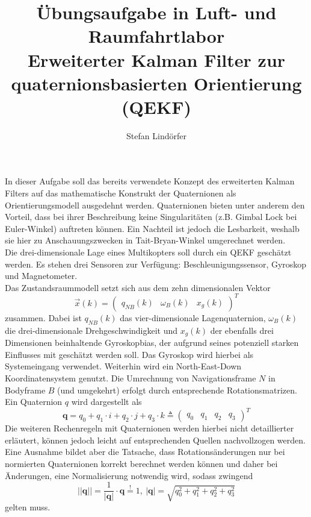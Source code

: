 \documentclass[12pt,a4paper]{article}
\begin{document}
	\title{Übungsaufgabe in Luft- und Raumfahrtlabor\\Erweiterter Kalman Filter zur quaternionsbasierten Orientierung (QEKF)}
	\author{Stefan Lindörfer}
	\maketitle{}
	
	In dieser Aufgabe soll das bereits verwendete Konzept des erweiterten Kalman Filters auf das mathematische Konstrukt der Quaternionen als Orientierungsmodell ausgedehnt werden. Quaternionen bieten unter anderem den Vorteil, dass bei ihrer Beschreibung keine Singularitäten (z.B. Gimbal Lock bei Euler-Winkel) auftreten können. Ein Nachteil ist jedoch die Lesbarkeit, weshalb sie hier zu Anschauungszwecken in Tait-Bryan-Winkel umgerechnet werden.\\
	
	Die drei-dimensionale Lage eines Multikopters soll durch ein QEKF geschätzt werden. Es stehen drei Sensoren zur Verfügung: Beschleunigungssensor, Gyroskop und Magnetometer.\\
	
	Das Zustandsraummodell setzt sich aus dem zehn dimensionalen Vektor
	\begin{equation}\label{eq:Zustandsraummodell}
		\vec{x}(k)= \begin{pmatrix}
		q_{NB}(k) & \omega_{B}(k) & x_{g}(k)
		\end{pmatrix}^{T}
	\end{equation}
	zusammen. Dabei ist $q_{NB}(k)$ das vier-dimensionale Lagenquaternion, $\omega_{B}(k)$ die drei-dimensionale Drehgeschwindigkeit und $x_{g}(k)$ der ebenfalls drei Dimensionen beinhaltende Gyroskopbias, der aufgrund seines potenziell starken Einflusses mit geschätzt werden soll. Das Gyroskop wird hierbei als Systemeingang verwendet. Weiterhin wird ein North-East-Down Koordinatensystem genutzt. Die Umrechnung von Navigationsframe $N$ in Bodyframe $B$ (und umgekehrt) erfolgt durch entsprechende Rotationsmatrizen. Ein Quaternion $q$ wird dargestellt als
	\begin{equation}\label{eq:QuaternionDarstellung}
		\textbf{q}=q_{0}+q_{1}\cdot i+q_{2}\cdot j+q_{3}\cdot k\triangleq \begin{pmatrix}
		q_{0} & q_{1} & q_{2} & q_{3}
		\end{pmatrix}^{T}		
	\end{equation}
	Die weiteren Rechenregeln mit Quaternionen werden hierbei nicht detaillierter erläutert, können jedoch leicht auf entsprechenden Quellen nachvollzogen werden. Eine Ausnahme bildet aber die Tatsache, dass Rotationsänderungen nur bei normierten Quaternionen korrekt berechnet werden können und daher bei Änderungen, eine Normalisierung notwendig wird, sodass zwingend
	\begin{equation}
		\vert\vert \textbf{q}\vert\vert = \frac{1}{|\textbf{q}|}\cdot \textbf{q} \overset{!}{=}1,~|\textbf{q}|= \sqrt{q_{0}^{2}+q_{1}^{2}+q_{2}^{2}+q_{3}^{2}}
	\end{equation}
	gelten muss.
\end{document}
